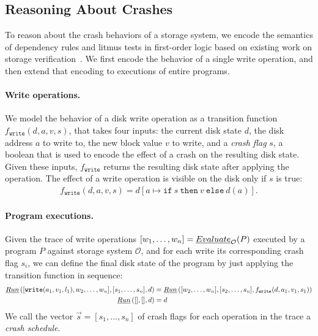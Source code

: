 \subsection{Reasoning About Crashes}\label{sec:problem:crashes}

To reason about the crash behaviors of a storage system,
we encode the semantics of dependency rules and litmus tests in first-order logic
based on existing work on storage verification~\cite{sigurbjarnarson:yggdrasil}.
We first encode the behavior of a single write operation,
and then extend that encoding to executions of entire programs.

\paragraph{Write operations.}
We model the behavior of a disk write operation as a transition function
$f_\texttt{write}(d, a, v, s)$,
that takes four inputs:
the current disk state $d$,
the disk address $a$ to write to,
the new block value $v$ to write,
and a \emph{crash flag} $s$,
a boolean that is used to encode the effect of a crash on the resulting disk state.
Given these inputs, $f_\texttt{write}$ returns the resulting disk state after applying the operation.
The effect of a write operation is visible on the disk only if $s$ is true:\tighten
\begin{align*}
    f_\texttt{write}(d, a, v, s) = d[a \mapsto \texttt{if}\ s\ \texttt{then}\ v \ \texttt{else}\ d(a)].
\end{align*}

\paragraph{Program executions.}
Given the trace of write operations $[w_1, \dots, w_n] = \evaluate{P}{\mathcal{O}}$
executed by a program $P$ against storage system $\mathcal{O}$,
and for each write its corresponding crash flag $s_i$,
we can define the final disk state of the program
by just applying the transition function in sequence:
\begin{align*}
    \run{[\texttt{write}(a_1, v_1, l_1), w_2, \dots, w_n]}{[s_1, \dots, s_n]}{d} &= \run{[w_2, \dots, w_n]}{[s_2, \dots, s_n]}{f_\texttt{write}(d, a_1, v_1, s_1)} \\
    \run{[]}{[]}{d} &= d
\end{align*}
We call the vector $\vec{s} = [s_1, \dots, s_n]$ of crash flags for each operation in the trace
a \emph{crash schedule}.

